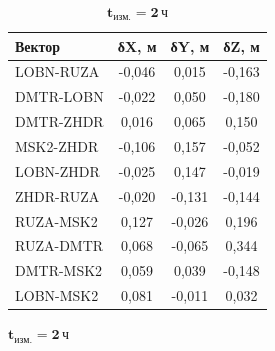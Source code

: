 \begin{table} [htbp]
	\centering\small
	\label{tab:tab36}{
		\begin{subtable}{.47\linewidth}	
			\centering
			\caption*{$\mathbf{t_\text{изм.}=1\,\text{ч}}$}
		\begin{tabular}{ l
		S[table-number-alignment = center]
		S[table-number-alignment = center]
		S[table-number-alignment = center] }
	
	
	\hline
	\textbf{Вектор}				& \textbf{δX, м}	& \textbf{δY, м}	& \textbf{δZ, м}	\\ \hline
	LOBN-RUZA					&     -0,046		& 	   0,015		&     -0,163		\\ %
	DMTR-LOBN					&     -0,022		&      0,050		&     -0,180		\\ %
	DMTR-ZHDR					&      0,016		&      0,065		&      0,150		\\ %
	MSK2-ZHDR					&     -0,106		&      0,157		&     -0,052		\\ %
	LOBN-ZHDR					&     -0,025		&      0,147		&     -0,019		\\ %
	ZHDR-RUZA					&     -0,020		&     -0,131		&     -0,144		\\ %
	RUZA-MSK2					&      0,127		&     -0,026		&      0,196		\\ %
	RUZA-DMTR					&      0,068		&     -0,065		&      0,344		\\ %
	DMTR-MSK2					&      0,059		&      0,039		&     -0,148		\\ %
	LOBN-MSK2					&      0,081		&     -0,011		&      0,032		\\ \hline

		\end{tabular}
	\end{subtable}%
		\qquad%
	\begin{subtable}{.47\linewidth}	
	\centering
	\caption*{$\mathbf{t_\text{изм.}=2\,\text{ч}}$}
	\begin{tabular}{ l
			S[table-number-alignment = center]
			S[table-number-alignment = center]
			S[table-number-alignment = center] }
		

\end{tabular}
\end{subtable}}
\end{table}
